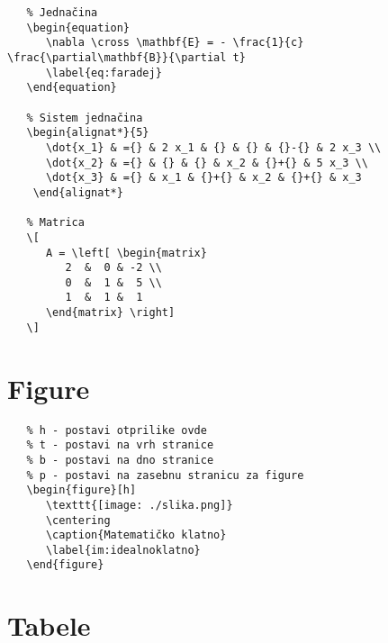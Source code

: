 \begin{verbatim}
   % Jednačina
   \begin{equation}
      \nabla \cross \mathbf{E} = - \frac{1}{c} \frac{\partial\mathbf{B}}{\partial t}
      \label{eq:faradej}
   \end{equation}

   % Sistem jednačina
   \begin{alignat*}{5}
      \dot{x_1} & ={} & 2 x_1 & {} & {} & {}-{} & 2 x_3 \\
      \dot{x_2} & ={} & {} & {} & x_2 & {}+{} & 5 x_3 \\
      \dot{x_3} & ={} & x_1 & {}+{} & x_2 & {}+{} & x_3
    \end{alignat*}

   % Matrica
   \[
      A = \left[ \begin{matrix}
         2  &  0 & -2 \\
         0  &  1 &  5 \\
         1  &  1 &  1
      \end{matrix} \right]
   \]
\end{verbatim}

\pagebreak

\section*{Figure}

\begin{verbatim}
   % h - postavi otprilike ovde
   % t - postavi na vrh stranice
   % b - postavi na dno stranice
   % p - postavi na zasebnu stranicu za figure
   \begin{figure}[h]
      \texttt{[image: ./slika.png]}
      \centering
      \caption{Matematičko klatno}
      \label{im:idealnoklatno}
   \end{figure}
\end{verbatim}

\pagebreak

\section*{Tabele}

